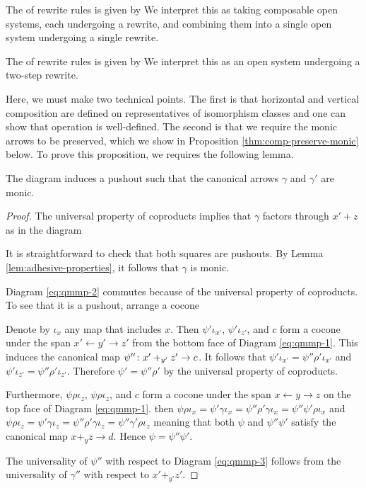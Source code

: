 \documentclass{amsart}
\begin{document}
The  of rewrite rules is given by
 We interpret this as
taking composable open systems, each undergoing a rewrite,
and combining them into a single open system undergoing a
single rewrite.

The  of rewrite rules is given by
 We interpret this as an open
system undergoing a two-step rewrite.  

Here, we must make two technical points. The first is that
horizontal and vertical composition are defined on
representatives of isomorphism classes and one can show that
operation is well-defined. The second is that we require the
monic arrows to be preserved, which we show in Proposition
\ref{thm:comp-preserve-monic} below. To prove this
proposition, we requires the following lemma.

\begin{lemma}
  \label{thm:quotient-map-monic-pushout}
  The diagram 
  induces a pushout
   such that the
  canonical arrows $ \gamma $ and $ \gamma' $ are monic.
\end{lemma}

\begin{proof}
  The universal property of coproducts implies
  that $ \gamma $ factors through $ x' + z $ as in
  the diagram 
   
  It is straightforward to check that both squares are
  pushouts. By Lemma \ref{lem:adhesive-properties}, it
  follows that $ \gamma $ is monic.

  Diagram \ref{eq:qmmp-2} commutes because of the universal
  property of coproducts.  To see that it is a pushout,
  arrange a cocone
  
  
  Denote by $ \iota_x $ any map that includes $ x $.  Then
  $ \psi' \iota_{x'} $, $ \psi' \iota_{z'} $, and $ c $ form
  a cocone under the span $ x' \gets y' \to z' $ from the
  bottom face of Diagram \ref{eq:qmmp-1}. This induces the
  canonical map $ \psi'' \colon x'+_{y'} z' \to c $. It
  follows that
  $ \psi' \iota_{x'} = \psi'' \rho' \iota_{x'} $ and
  $ \psi' \iota_{z'} = \psi'' \rho' \iota_{z'} $. Therefore
  $ \psi' = \psi'' \rho' $ by the universal property of
  coproducts.

  Furthermore, $ \psi \rho \iota_z $,
  $ \psi \rho \iota_z $, and $ c $ form a cocone
  under the span $ x \gets y \to z $ on the top
  face of Diagram \ref{eq:qmmp-1}. then
  $ \psi \rho \iota_x = \psi' \gamma \iota_x =
  \psi'' \rho' \gamma \iota_x = \psi'' \psi' \rho
  \iota_x $ and
  $ \psi \rho \iota_z = \psi' \gamma \iota_z =
  \psi'' \rho' \gamma \iota_z = \psi'' \gamma'
  \rho \iota_z $ meaning that both $ \psi $ and
  $ \psi'' \psi' $ satisfy the canonical map
  $ x+_yz \to d $. Hence $ \psi = \psi'' \psi' $.

  The universality of $ \psi'' $ with respect to
  Diagram \ref{eq:qmmp-3} follows from the
  universality of $ \gamma'' $ with respect to
  $ x'+_{y'}z' $.
\end{proof}
\end{document}
